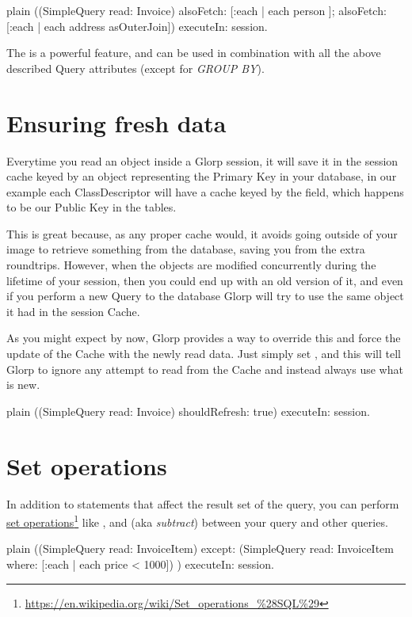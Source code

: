 \documentclass[10pt,twoside,english]{_support/latex/sbabook/sbabook}
\begin{document}
\begin{displaycode}{plain}
((SimpleQuery read: Invoice)
	alsoFetch: [:each | each person ];
	alsoFetch: [:each | each address asOuterJoin]) executeIn: session.
\end{displaycode}

The  is a powerful feature, and can be used in combination with
all the above described Query attributes (except for \textit{GROUP BY}).
\section{Ensuring fresh data}
Everytime you read an object inside a Glorp session, it will save it in the
session cache keyed by an object representing the Primary Key in your database,
in our example each ClassDescriptor will have a cache keyed by the  field,
which happens to be our Public Key in the tables.

This is great because, as any proper cache would, it avoids going
outside of your image to retrieve something from the database,
saving you from the extra roundtrips. However, when the objects are modified
concurrently during the lifetime of your session, then you could end up with
an old version of it, and even if you perform a new Query to the database
Glorp will try to use the same object it had in the session Cache.

As you might expect by now, Glorp provides a way to override this and force
the update of the Cache with the newly read data. Just simply set
, and this will tell Glorp to ignore any attempt
to read from the Cache and instead always use what is new.

\begin{displaycode}{plain}
((SimpleQuery read: Invoice) shouldRefresh: true) executeIn: session.
\end{displaycode}
\section{Set operations}
In addition to statements that affect the result set of the query,
you can perform
\href{https://en.wikipedia.org/wiki/Set_operations_%28SQL%29}{set operations}\footnote{\url{https://en.wikipedia.org/wiki/Set_operations_\%28SQL\%29}}
like ,  and  (aka \textit{subtract})
between your query and other queries.

\begin{displaycode}{plain}
((SimpleQuery read: InvoiceItem) except:
	(SimpleQuery read: InvoiceItem where: [:each | each price < 1000])
	) executeIn: session.
\end{displaycode}
\end{document}

